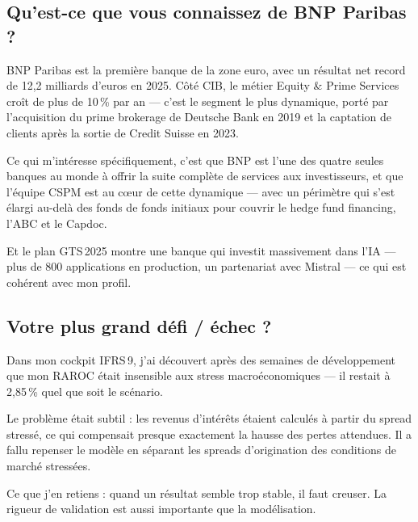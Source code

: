 \documentclass[11pt,a4paper]{article}
\begin{document}
\subsection{\og Qu'est-ce que vous connaissez de BNP Paribas ? \fg{}}

\begin{verbatimbox}
\og BNP Paribas est la premi\`ere banque de la zone euro, avec un r\'esultat
net record de 12,2 milliards d'euros en 2025. C\^ot\'e CIB, le m\'etier
Equity \& Prime Services cro\^it de plus de 10\,\% par an --- c'est le
segment le plus dynamique, port\'e par l'acquisition du prime brokerage
de Deutsche Bank en 2019 et la captation de clients apr\`es la sortie
de Credit Suisse en 2023.

Ce qui m'int\'eresse sp\'ecifiquement, c'est que BNP est l'une des quatre
seules banques au monde \`a offrir la suite compl\`ete de services aux
investisseurs, et que l'\'equipe CSPM est au c\oe{}ur de cette dynamique
--- avec un p\'erim\`etre qui s'est \'elargi au-del\`a des fonds de fonds
initiaux pour couvrir le hedge fund financing, l'ABC et le Capdoc.

Et le plan GTS\,2025 montre une banque qui investit massivement dans
l'IA --- plus de 800 applications en production, un partenariat avec
Mistral --- ce qui est coh\'erent avec mon profil. \fg{}
\end{verbatimbox}

\subsection{\og Votre plus grand d\'efi / \'echec ? \fg{}}

\begin{verbatimbox}
\og Dans mon cockpit IFRS\,9, j'ai d\'ecouvert apr\`es des semaines de
d\'eveloppement que mon RAROC \'etait insensible aux stress
macro\'economiques --- il restait \`a 2,85\,\% quel que soit le sc\'enario.

Le probl\`eme \'etait subtil : les revenus d'int\'er\^ets \'etaient
calcul\'es \`a partir du spread stress\'e, ce qui compensait presque
exactement la hausse des pertes attendues. Il a fallu repenser le
mod\`ele en s\'eparant les spreads d'origination des conditions de
march\'e stress\'ees.

Ce que j'en retiens : quand un r\'esultat semble trop stable, il faut
creuser. La rigueur de validation est aussi importante que la mod\'elisation. \fg{}
\end{verbatimbox}
\end{document}
